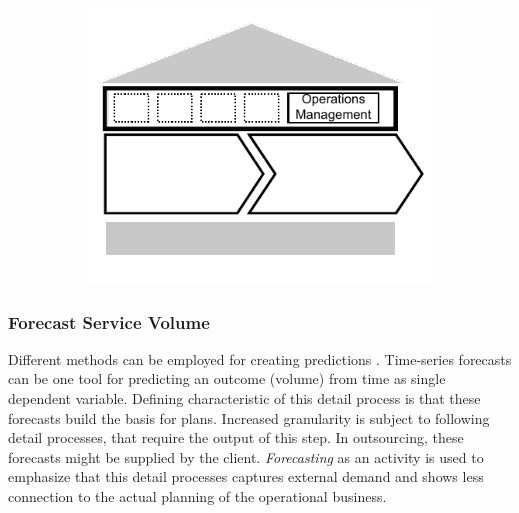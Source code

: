 	\begin{figure}[caption={\textsc{Operations Management} Process}, label={fig:wfm}]
		\begin{subfigure}[c]{.45\textwidth}
			\begin{center}
				\includegraphics{figures/processes/operationsmanagement.pdf}
			\end{center}
		\end{subfigure}
		\begin{subfigure}[c]{.45\textwidth}
			\begin{center}
			\end{center}
		\end{subfigure}
		
	\end{figure}
	
	\subsubsection{Forecast Service Volume}
	Different methods can be employed for creating predictions \citep{9780470525906}. Time-series forecasts can be one tool for predicting an outcome (volume) from time as single dependent variable. Defining characteristic of this detail process is that these forecasts build the basis for plans. Increased granularity is subject to following detail processes, that require the output of this step. In outsourcing, these forecasts might be supplied by the client. \textit{Forecasting} as an activity is used to emphasize that this detail processes captures external demand and shows less connection to the actual planning of the operational business.
	
